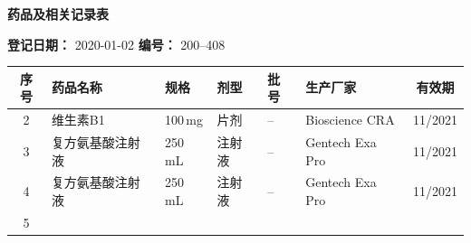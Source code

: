 \documentclass[UTF8,10pt,a4paper,fontset=fandol]{ctexart}
\newcommand{\fieldvalue}[1]{#1}
\begin{document}

\newpage

\begin{center}
\textbf{药品及相关记录表}
\end{center}

\noindent
\textbf{登记日期：}
\fieldvalue{2020-01-02}
\hfill
\textbf{编号：}
\fieldvalue{200--408}

\begin{tabularx}{\textwidth}{|c|X|X|X|X|X|c|}
\hline
序号 & 药品名称 & 规格 & 剂型 & 批号 & 生产厂家 & 有效期 \\
\hline
2 &
\fieldvalue{维生素B1} &
\fieldvalue{100\,mg} &
\fieldvalue{片剂} &
\fieldvalue{--} &
\fieldvalue{Bioscience CRA} &
\fieldvalue{11/2021} \\
\hline
3 &
\fieldvalue{复方氨基酸注射液} &
\fieldvalue{250\,mL} &
\fieldvalue{注射液} &
\fieldvalue{--} &
\fieldvalue{Gentech Exa Pro} &
\fieldvalue{11/2021} \\
\hline
4 &
\fieldvalue{复方氨基酸注射液} &
\fieldvalue{250\,mL} &
\fieldvalue{注射液} &
\fieldvalue{--} &
\fieldvalue{Gentech Exa Pro} &
\fieldvalue{11/2021} \\
\hline
5 &

\end{tabularx}
\end{document}
